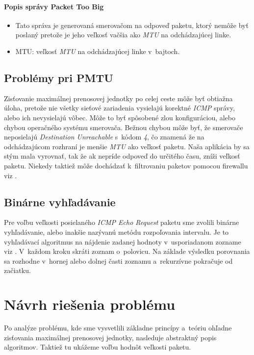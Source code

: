 \documentclass[12pt,a4paper,titlepage]{article}
\begin{document}
    \paragraph{Popis správy Packet Too Big}
        \begin{itemize}
            \item Tato správa je generovaná smerovačom na odpoveď paketu, ktorý
                nemôže 
                byť poslaný pretože je jeho veľkosť vačšia ako \emph{MTU} na
                odchádzajúcej linke.
            \item MTU: veľkosť \emph{MTU} na odchádzajúcej linke v~bajtoch.
        \end{itemize}

    \subsection{Problémy pri PMTU}
        Zisťovanie maximálnej prenosovej jednotky po celej ceste môže byť obtiažna 
        úloha, pretože nie všetky sieťové zariadenia vysielajú korektné \emph{ICMP} správy,
        alebo ich nevysielajú vôbec. Môže to byť spôsobené zlou konfiguráciou, alebo chybou 
        operačného systému smerovača. Bežnou chybou môže byť, že smerovače neposielajú 
        \emph{Destination Unreachable} s~kódom \emph{4}, čo znamená že na odchádzajúcom 
        rozhraní je menšie \emph{MTU} ako veľkosť paketu. Naša aplikácia by sa stým mala
        vyrovnať, tak že ak nepríde odpoveď do určitého času, zníži veľkosť paketu. 
        Niekedy taktiež môže dochádzať k~filtrovaniu paketov pomocou firewallu viz \cite{rfc_pmtu_problem}.

     \subsection{Binárne vyhľadávanie}
        Pre voľbu veľkosti posielaného \emph{ICMP Echo Request} paketu sme
        zvolili binárne vyhľadávanie, alebo inakšie nazývanú metódu rozpoľovania intervalu.
        Je to vyhľadávací algoritmus na nájdenie zadanej hodnoty v~usporiadanom zozname viz \cite{matematika_3}. 
        V~každom kroku skráti zoznam o~polovicu.
        Na základe výsledku porovnania sa rozhodne v~hornej alebo dolnej časti zoznamu 
        a~rekurzívne pokračuje od začiatku.

    \section{Návrh riešenia problému} \label{navrh}
        Po analýze problému, kde sme vysvetlili základne princípy a~teóriu ohľadne
        zisťovania maximálnej prenosovej jednotky, nasleduje abstraktný popis algoritmov.
        Taktiež tu ukážeme voľbu hodnôt veľkosti paketu.
\end{document}
